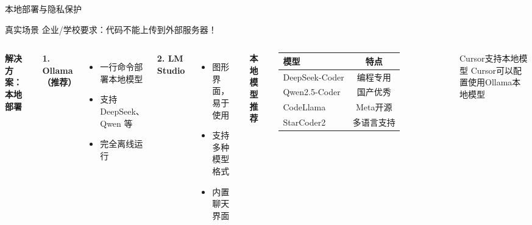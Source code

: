 
\begin{frame}{本地部署与隐私保护}
	\begin{alertblock}{真实场景}
		企业/学校要求：代码不能上传到外部服务器！
	\end{alertblock}

	\vspace{0.3cm}

	\begin{columns}
		\textbf{解决方案：本地部署}

		\vspace{0.3cm}

		\textbf{1. Ollama（推荐）}
		\begin{itemize}
			\item 一行命令部署本地模型
			\item 支持 DeepSeek、Qwen 等
			\item 完全离线运行
		\end{itemize}

		\vspace{0.2cm}

		\textbf{2. LM Studio}
		\begin{itemize}
			\item 图形界面，易于使用
			\item 支持多种模型格式
			\item 内置聊天界面
		\end{itemize}

		\textbf{本地模型推荐}

		\vspace{0.3cm}

		\begin{table}
			\centering
			\small
			\begin{tabular}{lc}
				\toprule
				\textbf{模型} & \textbf{特点} \\
				\midrule
				DeepSeek-Coder & 编程专用 \\
				Qwen2.5-Coder & 国产优秀 \\
				CodeLlama & Meta开源 \\
				StarCoder2 & 多语言支持 \\
				\bottomrule
			\end{tabular}
		\end{table}

		\vspace{0.3cm}

		\begin{exampleblock}{Cursor支持本地模型}
			Cursor可以配置使用Ollama本地模型
		\end{exampleblock}
	\end{columns}
\end{frame}

